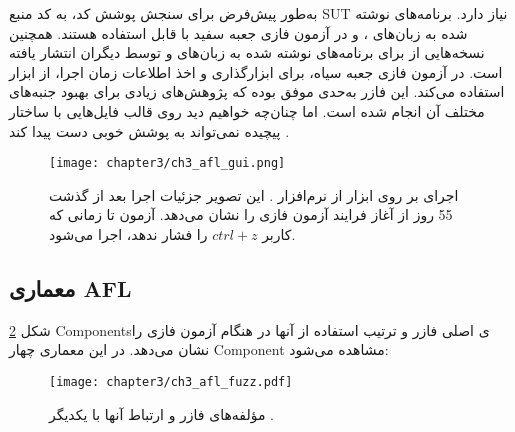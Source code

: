   
 به‌طور پیش‌فرض  برای سنجش پوشش کد، به کد منبع \gls{SUT}  نیاز دارد. برنامه‌های نوشته شده به زبان‌های 
 ،
  و
 در آزمون فازی جعبه سفید با  قابل استفاده هستند. همچنین نسخه‌هایی از  برای برنامه‌های نوشته شده به زبان‌های
 	  و 
 	  توسط دیگران انتشار یافته است.  در آزمون فازی جعبه سیاه، برای ابزارگذاری و اخذ اطلاعات زمان اجرا، از ابزار
 	    \cite{QEMU2018}
 	   استفاده می‌کند. این فازر به‌حدی موفق بوده‌ که پژوهش‌های زیادی برای بهبود جنبه‌های مختلف آن انجام شده است. اما چنان‌چه خواهیم دید روی قالب فایل‌هایی با ساختار پیچیده نمی‌تواند به پوشش خوبی دست پیدا کند \cite{DBLP:journals/corr/abs-1711-04596}.
 	   
 	   
 \begin{figure}[H]%
 	   	\centering
 	   	\texttt{[image: chapter3/ch3\_afl\_gui.png]}
 	   	\caption[محیط زمان اجرای AFL]
 	   	{
 	اجرای  بر روی ابزار   از نرم‌افزار 
 	 \cite{MuPDF2018}. این تصویر جزئیات اجرا بعد از گذشت 55 روز از آغاز فرایند آزمون فازی را نشان می‌دهد. آزمون تا زمانی که کاربر $ctrl+z$ را فشار ندهد، اجرا می‌شود.
 	   	}
 	   	\label{ch3_afl_gui.png}
\end{figure}
 	      
 	   
 	   

\subsection{معماری AFL}
‏شکل \ref{ch3_afl_fuzz.png} 
\glspl{Component}ی 
اصلی فازر   و ترتیب استفاده از آنها در هنگام آزمون فازی را نشان می‌دهد. در این معماری چهار \gls{Component} مشاهده می‌شود: 

 \begin{figure}%
	\centering
	\texttt{[image: chapter3/ch3\_afl\_fuzz.pdf]}
	\caption[مؤلفه‌های فازر  و ارتباط آنها]
{
	مؤلفه‌های فازر  و ارتباط آنها با یکدیگر
	\cite{Zalewsky2013}.
}
\label{ch3_afl_fuzz.png}
\end{figure}



